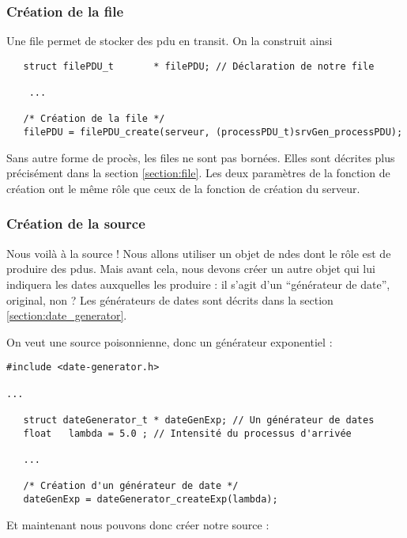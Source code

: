 \subsubsection{Création de la file}

   Une file permet de stocker des {\sc pdu} en transit. On la
construit ainsi

\begin{verbatim}
   struct filePDU_t       * filePDU; // Déclaration de notre file

    ...

   /* Création de la file */
   filePDU = filePDU_create(serveur, (processPDU_t)srvGen_processPDU);
\end{verbatim}

   Sans autre forme de procès, les files ne sont pas bornées. Elles
sont décrites plus précisément dans la section \ref{section:file}. Les
deux paramètres de la fonction de création ont le même rôle que ceux
de la fonction de création du serveur.

%
\subsubsection{Création de la source}

   Nous voilà à la source ! Nous allons utiliser un objet de {\sc
ndes} dont le rôle est de produire des {\sc pdu}s. Mais avant cela,
nous devons créer un autre objet qui lui indiquera les dates
auxquelles les produire : il s'agit d'un ``générateur de date'',
original, non ? Les générateurs de dates sont décrits dans la section \ref{section:date_generator}.

   On veut une source poisonnienne, donc un générateur exponentiel :

\begin{verbatim}
#include <date-generator.h>

...

   struct dateGenerator_t * dateGenExp; // Un générateur de dates
   float   lambda = 5.0 ; // Intensité du processus d'arrivée

   ...

   /* Création d'un générateur de date */
   dateGenExp = dateGenerator_createExp(lambda);
\end{verbatim}

   Et maintenant nous pouvons donc créer notre source :

